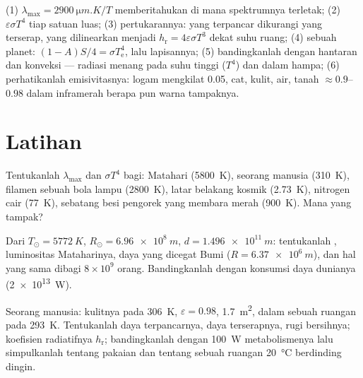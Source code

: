 \begin{method}\label{meth:b2:thermal-radiation:method}
(1) $\lambda_{\max} = \qty{2900}{\micro m.K}/T$ memberitahukan di mana spektrumnya
terletak; (2) $\varepsilon\sigma T^4$ tiap satuan luas; (3) pertukarannya: yang terpancar
dikurangi yang terserap, yang dilinearkan menjadi $h_{\text{r}} = 4\varepsilon\sigma T^3$ dekat
suhu ruang; (4) sebuah planet: $(1 - A)S/4 = \sigma T_{\text{e}}^4$, lalu
lapisannya; (5) bandingkanlah dengan hantaran dan konveksi --- radiasi
menang pada suhu tinggi ($T^4$) dan dalam hampa; (6) perhatikanlah emisivitasnya:
logam mengkilat \qty{0.05}{}, cat, kulit, air, tanah $\approx 0.9$--$0.98$
dalam inframerah berapa pun warna tampaknya.
\end{method}

\section{Latihan}

\begin{exercise}[$\star$]\label{exo:b2:thermal-radiation:1}
Tentukanlah $\lambda_{\max}$ dan $\sigma T^4$ bagi: Matahari (\qty{5800}{K}), seorang manusia
(\qty{310}{K}), filamen sebuah bola lampu (\qty{2800}{K}), latar belakang kosmik
(\qty{2.73}{K}), nitrogen cair (\qty{77}{K}), sebatang besi pengorek yang membara merah
(\qty{900}{K}). Mana yang tampak?
\end{exercise}

\begin{exercise}[$\star$]\label{exo:b2:thermal-radiation:2}
Dari $T_\odot = \qty{5772}{K}$, $R_\odot = \qty{6.96e8}{m}$, $d = \qty{1.496e11}{m}$:
tentukanlah , luminositas Mataharinya, daya yang dicegat
Bumi ($R = \qty{6.37e6}{m}$), dan hal yang sama dibagi $8 \times 10^9$
orang. Bandingkanlah dengan konsumsi daya dunianya (\qty{2e13}{W}).
\end{exercise}

\begin{exercise}[$\star$]\label{exo:b2:thermal-radiation:3}
Seorang manusia: kulitnya pada \qty{306}{K}, $\varepsilon = 0.98$, \qty{1.7}{m^2}, dalam sebuah
ruangan pada \qty{293}{K}. Tentukanlah daya terpancarnya, daya terserapnya, rugi bersihnya;
koefisien radiatifnya $h_{\text{r}}$; bandingkanlah dengan \qty{100}{W}
metabolismenya lalu simpulkanlah tentang pakaian dan tentang sebuah ruangan \qty{20}{\celsius}
berdinding dingin.
\end{exercise}

